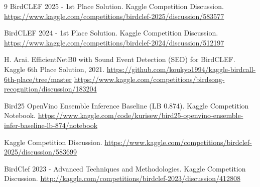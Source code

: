 \documentclass[ERTS, 2025]{ERTS}
\begin{document}
\begin{thebibliography}{9}
BirdCLEF 2025 - 1st Place Solution.
\newblock Kaggle Competition Discussion.
\newblock \url{https://www.kaggle.com/competitions/birdclef-2025/discussion/583577}

BirdCLEF 2024 - 1st Place Solution.
\newblock Kaggle Competition Discussion.
\newblock \url{https://www.kaggle.com/competitions/birdclef-2024/discussion/512197}

H. Arai.
\newblock EfficientNetB0 with Sound Event Detection (SED) for BirdCLEF.
\newblock Kaggle 6th Place Solution, 2021.
\newblock \url{https://github.com/koukyo1994/kaggle-birdcall-6th-place/tree/master}
\newblock \url{https://www.kaggle.com/competitions/birdsong-recognition/discussion/183204}

Bird25 OpenVino Ensemble Inference Baseline (LB 0.874).
\newblock Kaggle Competition Notebook.
\newblock \url{https://www.kaggle.com/code/kurisew/bird25-openvino-ensemble-infer-baseline-lb-874/notebook}

\newblock Kaggle Competition Discussion.
\newblock \url{https://www.kaggle.com/competitions/birdclef-2025/discussion/583699}

BirdClef 2023 - Advanced Techniques and Methodologies.
\newblock Kaggle Competition Discussion.
\newblock \url{http://kaggle.com/competitions/birdclef-2023/discussion/412808}

\end{thebibliography}

\twocolumn
\end{document}
